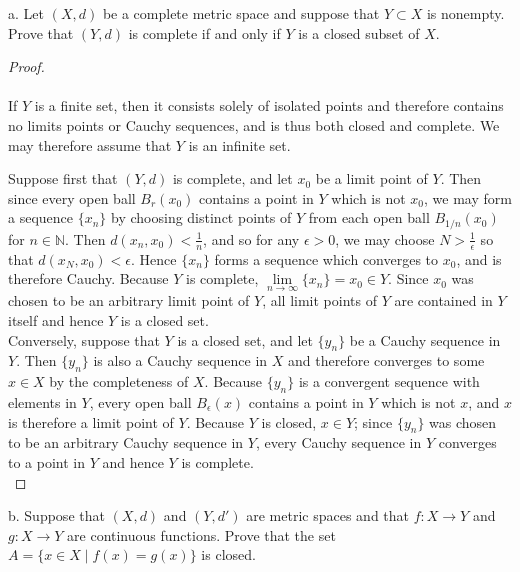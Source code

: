 a.  Let $(X, d)$ be a complete metric space and suppose that $Y \subset X$ is nonempty. Prove that $(Y, d)$ is complete 
    if and only if $Y$ is a closed subset of $X$.

\begin{proof}\ \\\\
    If $Y$ is a finite set, then it consists solely of isolated points and therefore contains no limits points or Cauchy
    sequences, and is thus both closed and complete. We may therefore assume that $Y$ is an infinite set.

    Suppose first that $(Y, d)$ is complete, and let $x_0$ be a limit point of $Y$. Then since every open ball 
    $B_r(x_0)$ contains a point in $Y$ which is not $x_0$, we may form a sequence $\{x_n\}$ by choosing distinct points
    of $Y$ from each open ball $B_{1/n}(x_0)$ for $n \in \mathbb{N}$. Then $d(x_n, x_0) < \frac{1}{n}$, and so for any 
    $\epsilon > 0$, we may choose $N > \frac{1}{\epsilon}$ so that $d(x_N, x_0) < \epsilon$. Hence $\{x_n\}$ forms a 
    sequence which converges to $x_0$, and is therefore Cauchy. Because $Y$ is complete, 
    $\lim\limits_{n \to \infty}{\{x_n\}} = x_0 \in Y$. Since $x_0$ was chosen to be an arbitrary limit point of $Y$, 
    all limit points of $Y$ are contained in $Y$ itself and hence $Y$ is a closed set.
    \ \\

    Conversely, suppose that $Y$ is a closed set, and let $\{y_n\}$ be a Cauchy sequence in $Y$. Then $\{y_n\}$ is also
    a Cauchy sequence in $X$ and therefore converges to some $x \in X$ by the completeness of $X$. Because $\{y_n\}$ is
    a convergent sequence with elements in $Y$, every open ball $B_{\epsilon}(x)$ contains a point in $Y$ which is not 
    $x$, and $x$ is therefore a limit point of $Y$. Because $Y$ is closed, $x \in Y$; since $\{y_n\}$ was chosen to be 
    an arbitrary Cauchy sequence in $Y$, every Cauchy sequence in $Y$ converges to a point in $Y$ and hence $Y$ is 
    complete.
    \ \\
\end{proof}

\pagebreak


b. Suppose that $(X, d)$ and $(Y, d')$ are metric spaces and that $f:X \to Y$ and $g:X \to Y$ are continuous functions.
   Prove that the set $A = \{ x \in X \mid f(x) = g(x)\}$ is closed.

